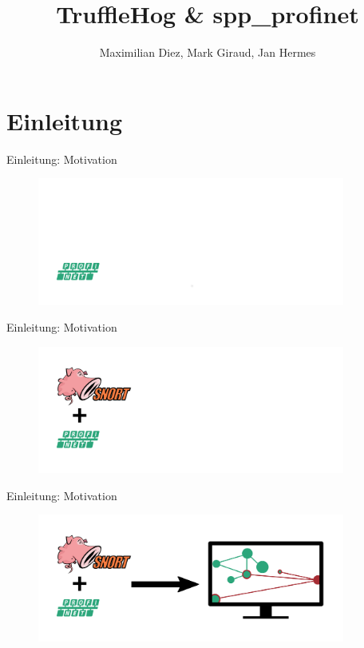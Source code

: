\documentclass[18pt]{beamer}
\title[TruffleHog \& spp\_profinet]{TruffleHog \& spp\_profinet}
\author{Maximilian Diez, Mark Giraud, Jan Hermes}
\institute{Fraunhofer IOSB}
\begin{document}

\begin{frame}
\titlepage
\end{frame}


\section{Einleitung}
\begin{frame}{Einleitung: Motivation}
	\begin{figure}
  		\includegraphics[width=0.9\textwidth]{./images/max_1.png}
  	\end{figure}
\end{frame}
\begin{frame}{Einleitung: Motivation}
  	\begin{figure}
  		\includegraphics[width=0.9\textwidth]{./images/max_2.png}
  	\end{figure}
\end{frame}
\begin{frame}{Einleitung: Motivation}
  	\begin{figure}
  		\includegraphics[width=0.9\textwidth]{./images/max_3.png}
  	\end{figure}
\end{frame}
\end{document}
